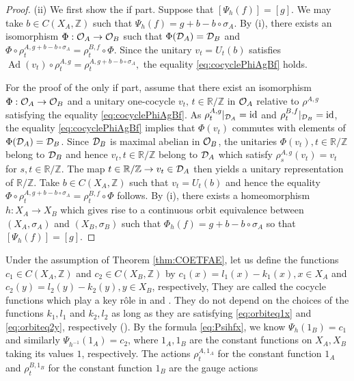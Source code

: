 \documentclass[11pt]{article}
\theoremstyle{plain}
\theoremstyle{definition}
\numberwithin{equation}{section}
\newcommand{\id}{\operatorname{id}}
\newcommand{\Ad}{\operatorname{Ad}}
\newcommand{\RZ}{\mathbb{R}/{\mathbb{Z}}}
\newcommand{\Z}{\mathbb{Z}}
\begin{document}
\begin{proof}
(ii) 
We first show the if part.
Suppose that
$[\Psi_h(f)] =[g]$.
We may take $b \in C(X_A,\Z)$ such that 
$\Psi_h(f) = g + b -b\circ\sigma_A$.
By (i),  
there exists an isomorphism
$\Phi: {{\mathcal{O}}_A} \rightarrow {{\mathcal{O}}_B}$
such that
$\Phi({{\mathcal{D}}_A}) = {{\mathcal{D}}_B}$
and
$
\Phi\circ \rho^{A,g+b-b\circ\sigma_A}_t 
= 
\rho^{B,f}_t\circ \Phi.
$
Since the  unitary 
$v_t = U_t(b)$
satisfies 
$
\Ad(v_t) \circ
\rho^{A,g}_t
=\rho^{A,g+b-b\circ\sigma_A}_t, 
$ 
the equality
\eqref{eq:cocyclePhiAgBf}
holds.


For the proof of the only if part, 
assume that there exist an 
isomorphism
$\Phi:{{\mathcal{O}}_A}\rightarrow {{\mathcal{O}}_B}$   
and
 a unitary one-cocycle 
$v_t, \, t \in \RZ$ 
in ${{\mathcal{O}}_A}$ relative to
$\rho^{A,g}$
 satisfying the equality \eqref{eq:cocyclePhiAgBf}.
As $\rho^{A,g}_t|_{\DA} = \id$ and
$\rho^{B,f}_t|_{\DB} = \id$,
the equality \eqref{eq:cocyclePhiAgBf} 
implies that $\Phi(v_t)$ 
commutes with elements of 
$\Phi({{\mathcal{D}}_A}) = {{\mathcal{D}}_B}$.
Since ${{\mathcal{D}}_B}$ is maximal abelian in ${{\mathcal{O}}_B}$,
the unitaries
$\Phi(v_t), t \in \RZ$ belong to ${{\mathcal{D}}_B}$
and hence
$v_t, t \in \RZ$ belong to ${{\mathcal{D}}_A}$
which satisfy
$\rho^{A,g}_s(v_t) = v_t$ for $s,t \in \RZ$.
The map $t \in \RZ \rightarrow v_t \in \DA$
then yields a unitary representation of $\RZ$.
Take $b \in C(X_A,\Z)$ 
such that 
$v_t = U_t(b)$
and hence 
 the equality
$
\Phi\circ \rho^{A,g+b-b\circ\sigma_A}_t 
= 
\rho^{B,f}_t\circ \Phi
$
follows.
By (i), there exists a homeomorphism
$h:X_A \rightarrow X_B$ which gives rise to a continuous orbit equivalence
between $(X_A,\sigma_A)$ and $(X_B,\sigma_B)$
such that
$\varPhi_h(f) = g+b-b\circ\sigma_A$
so that 
$[\Psi_h(f) ] =[g]$.
\end{proof}
Under the assumption of Theorem \ref{thm:COETFAE},
let us define the functions 
$c_1 \in C(X_A,\Z)
$ and
$ 
 c_2 \in C(X_B,\Z)
$
 by 
$c_1(x) = l_1(x) -k_1(x), x \in X_A$
and
$c_2(y) = l_2(y) -k_2(y), y \in X_B$,
respectively,
They are called the cocycle functions 
which play a key r{\^{o}}le in \cite{MaPre2014} and \cite{MMPre2014}.
They do not depend on the choices of the functions
$k_1, l_1$ and $k_2,l_2$ as long as they are satisfying 
\eqref{eq:orbiteq1x} and \eqref{eq:orbiteq2y},
respectively (\cite[Lemma 4.1]{MMPre2014}).
By the formula \eqref{eq:Psihfx},
we know $\Psi_h(1_B) = c_1$ and similarly 
$\Psi_{h^{-1}}(1_A) = c_2$,
where 
$1_A, 1_B$ are the constant functions on $X_A, X_B$ taking its values $1$,
respectively.
The actions 
$\rho_t^{A,1_A}$ for the constant function $1_A$
and
$\rho_t^{B,1_B}$ for the constant function $1_B$
are the gauge actions 
\end{document}
